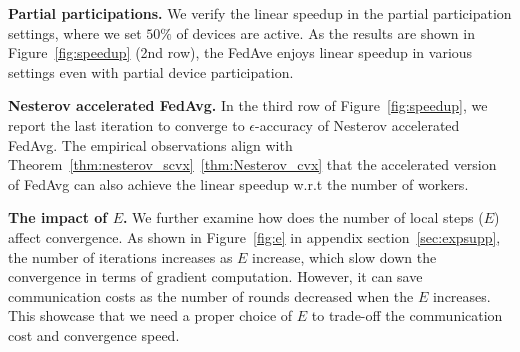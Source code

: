 \textbf{Partial participations.} We verify the linear speedup in the
partial participation settings, where we set $50\%$ of devices
are active. As the results are shown in Figure~\ref{fig:speedup} (2nd row), the 
FedAve enjoys linear speedup in various settings even with partial
device participation.

\textbf{Nesterov accelerated FedAvg.} In the third row of Figure~\ref{fig:speedup}, 
we report the last iteration to converge to $\epsilon$-accuracy of Nesterov accelerated FedAvg. The empirical observations align with Theorem~\ref{thm:nesterov_scvx}~\ref{thm:Nesterov_cvx} that the accelerated version of FedAvg can also achieve the linear speedup
w.r.t the number of workers.

\textbf{The impact of $E$.} We further examine how does the number of local steps ($E$) 
affect convergence. As shown in Figure~\ref{fig:e} in appendix section~\ref{sec:expsupp}, the number of iterations increases as $E$ increase, which slow down the convergence in
terms of gradient computation. However, it can save communication costs as
the number of rounds decreased when the $E$ increases. This showcase that
we need a proper choice of $E$ to trade-off the communication cost and
convergence speed. 


